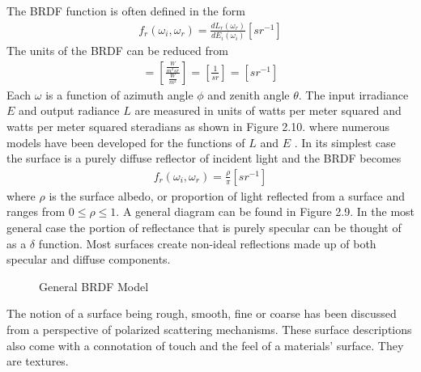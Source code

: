 The BRDF function is often defined in the form
%
\begin{align}
    f_r(\omega_i, \omega_r) = \frac{dL_r(\omega_r)}{dE_i(\omega_i)}[{sr}^{-1}]
\end{align}
%
The units of the BRDF can be reduced from
\begin{align}
    [\frac{dL_r(\omega_r) units}{dE_i(\omega_i) units}] = [\frac{\frac{W}{m^2sr}}{\frac{W}{m^2}}] = [\frac{1}{sr}] = [{sr}^{-1}]
\end{align}
Each $\omega$ is a function of azimuth angle $\phi$ and zenith angle $\theta$. The input irradiance $E$ and output radiance $L$ are measured in units of watts per meter squared and watts per meter squared steradians as shown in Figure 2.10.
where numerous models have been developed for the functions of $L$ and $E$ \cite{sparrow}\cite{brdfoverview}.  In its simplest case the surface is a purely diffuse reflector of incident light and the BRDF becomes
%
\begin{align}
    f_r(\omega_i, \omega_r) = \frac{\rho}{\pi}[{sr}^{-1}]
\end{align}
%
where $\rho$ is the surface albedo, or proportion of light reflected from a surface \cite{nicodemus} and ranges from $0\leq\rho\leq1$.  A general diagram can be found in Figure 2.9.  In the most general case the portion of reflectance that is purely specular can be thought of as a $\delta$ function.  Most surfaces create non-ideal reflections made up of both specular and diffuse components.
%
\begin{figure}
    \begin{center}
    \end{center}
    \caption{General BRDF Model}
    \label{fig:scattering}
\end{figure}
%
The notion of a surface being rough, smooth, fine or coarse has been discussed from a perspective of polarized scattering mechanisms. These surface descriptions also come with a connotation of touch and the feel of a materials' surface.  They are textures.
